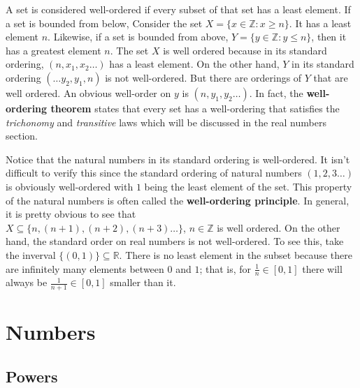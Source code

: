 \documentclass[12pt]{report}
\begin{document}
\hspace*{\parindent}A set is considered well-ordered if every subset of that set has a least element. If a set is bounded from below, Consider the set $X=\{x \in \mathbb{Z} : x \geq n\}$. It has a least element $n$. Likewise, if a set is bounded from above, $Y=\{y \in \mathbb{Z} : y \leq n\}$, then it has a greatest element $n$. The set $X$ is well ordered because in its standard ordering, $(n, x_1, x_2 \dots)$ has a least element. On the other hand, $Y$ in its standard ordering $(\dots y_2, y_1, n)$ is not well-ordered. But there are orderings of $Y$ that are well ordered. An obvious well-order on $y$ is $(n, y_1, y_2 \dots)$. In fact, the \textbf{well-ordering theorem} states that every set has a well-ordering that satisfies the \textit{trichonomy} and \textit{transitive} laws which will be discussed in the real numbers section.

Notice that the natural numbers in its standard ordering is well-ordered. It isn't difficult to verify this since the standard ordering of natural numbers $(1, 2, 3 \dots)$ is obviously well-ordered with $1$ being the least element of the set. This property of the natural numbers is often called the \textbf{well-ordering principle}. In general, it is pretty obvious to see that \\
$X \subseteq \{n, (n+1), (n+2), (n+3)\dots \}$, $n \in \mathbb{Z}$ is well ordered.
On the other hand, the standard order on real numbers is not well-ordered. To see this, take the inverval $\{(0, 1)\} \subseteq \mathbb{R}$. There is no least element in the subset because there are infinitely many elements between $0$ and $1$; that is, for $\frac{1}{n} \in [0, 1]$ there will always be $\frac{1}{n+1} \in [0, 1]$ smaller than it.


\newpage

\chapter{Numbers}

\newpage

\section{Powers}
\end{document}
